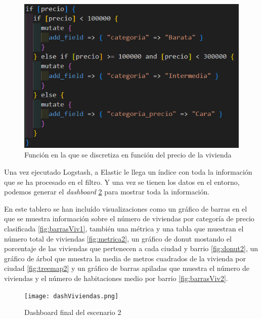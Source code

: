 \begin{figure}
    \centering
    \includegraphics[width=1\linewidth]{img/discretizacion.png}
    \caption{Función en la que se discretiza en función del precio de la vivienda}
    \label{fig:discre}
\end{figure}

Una vez ejecutado Logstash, a Elastic le llega un índice con toda la información que se ha procesado en el filtro. Y una vez se tienen los datos en el entorno, podemos generar el \textit{dashboard} \ref{fig:dashboard2} para mostrar toda la información.

En este tablero se han incluído visualizaciones como un gráfico de barras en el que se muestra información sobre el número de viviendas por categoría de precio clasificada \ref{fig:barrasViv1}, también una métrica y una tabla que muestran el número total de viviendas \ref{fig:metrica2}, un gráfico de donut mostando el porcentaje de las viviendas que pertenecen a cada ciudad y barrio \ref{fig:donut2}, un gráfico de árbol que muestra la media de metros cuadrados de la vivienda por ciudad \ref{fig:treemap2} y un gráfico de barras apiladas que muestra el número de viviendas y el número de habitaciones medio por barrio \ref{fig:barrasViv2}.

\begin{figure}
    \centering
    \texttt{[image: dashViviendas.png]}
    \caption{Dashboard final del escenario 2}
    \label{fig:dashboard2}
\end{figure}

